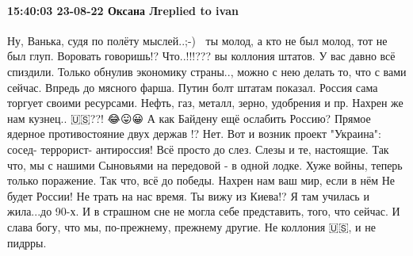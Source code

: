 
 
 
 
 

\paragraph{15:40:03 23-08-22 Оксана Лreplied to ivan}

Ну, Ванька, судя по полёту мыслей..;-) 🤣😂ты молод, а кто не был молод, тот не был глуп. Воровать говоришь!? Что..!!!??? вы коллония штатов. У вас давно всё спиздили. Только обнулив экономику страны.., можно с нею делать то, что с вами сейчас. Впредь до мясного фарша. Путин болт штатам показал. Россия сама торгует своими ресурсами. Нефть, газ, металл, зерно, удобрения и пр. Нахрен же нам кузнец.. 🇺🇸??! 😂😛😀
А как Байдену ещё ослабить Россию? Прямое ядерное противостояние двух держав !? Нет. Вот и возник проект "Украина": сосед- террорист-  антироссия! Всё просто до слез. Слезы и те, настоящие. Так что, мы с нашими Сыновьями на передовой - в одной лодке. Хуже войны, теперь только поражение. Так что, всё до победы. Нахрен нам ваш мир, если в нём Не будет России! Не трать на нас время. 
Ты вижу из Киева!? Я там училась и жила...до 90-х. И в страшном сне не могла себе представить, того, что сейчас. И слава богу, что мы, по-прежнему, прежнему другие. Не коллония 🇺🇸, и не пидрры.
